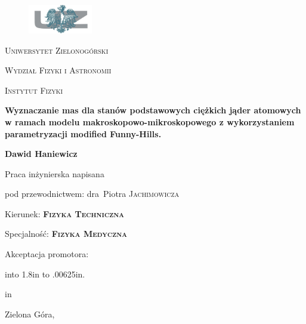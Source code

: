\documentclass[a4paper,polish]{article}
\def\signature#1#2#3{{\hskip#1in{\hbox to #2in%
{\leaders\hbox to .00625in{\hfil.\hfil}\hfill}}%
 \par\hskip#1in#3\vskip1cm}}
\numberwithin{equation}{section}
\begin{document}
\begin{titlepage}
	\renewcommand{\baselinestretch}{1} 
	\centering
	\begin{figure}[t]
	\centering
	\includegraphics[width=0.25\textwidth]{logo_uz}
	\end{figure}
	\vspace{1cm}
	{\scshape\huge Uniwersytet Zielonogórski \par}
	{\scshape\LARGE Wydział Fizyki i Astronomii \par}
	{\scshape\Large Instytut Fizyki \par}
	\vspace{1.5cm}
	{\Large\bfseries Wyznaczanie mas dla stanów podstawowych ciężkich jąder atomowych w ramach modelu makroskopowo-mikroskopowego z wykorzystaniem parametryzacji modif{}ied Funny-Hills. \par}
	\vspace{1cm}
	{\Large\textbf{Dawid Haniewicz} \par}
	\vspace{2cm}
	Praca inżynierska napisana \par
	pod przewodnictwem: dra~Piotra \textsc{Jachimowicza} \par
	\vspace{1.5cm}
	{Kierunek: \textsc{\textbf{Fizyka Techniczna}} \par}
	{Specjalność: \textsc{\textbf{Fizyka Medyczna}} \par}
	\vspace{1.5cm}
	Akceptacja promotora: \par
	\vspace{0.5cm}
	\signature{0}{1.8}
	\vfill
	{\large Zielona Góra, \the\year \par}
	\thispagestyle{empty}
\end{titlepage}

\setcounter{page}{2}

\clearpage
\tableofcontents
\clearpage

\end{document}
